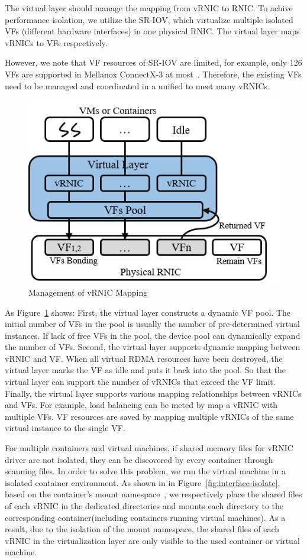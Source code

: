 The virtual layer should manage the mapping from vRNIC to RNIC. To achive performance isolation, we utilize the SR-IOV, which virtualize multiple isolated VFs (different hardware interfaces) in one physical RNIC. The virtual layer maps vRNICs to VFs respectively. 

However, we note that VF resources of SR-IOV are limited, for example, only 126 VFs are supported in Mellanox ConnectX-3 at most~\cite{ofed-manual}. Therefore, the existing VFs need to be managed and coordinated in a unified to meet many vRNICs.

\begin{figure}[!ht]
	\centering
	\includegraphics[width=0.9\linewidth]{images/vf-mapping}
	\caption{Management of vRNIC Mapping}
	\label{fig:vf-mapping}
\end{figure}

As Figure~\ref{fig:vf-mapping} shows: First, the virtual layer constructs a dynamic VF pool. The initial number of VFs in the pool is usually the number of pre-determined virtual instances. If lack of free VFs in the pool, the device pool can dynamically expand the number of VFs. Second, the virtual layer supports dynamic mapping between vRNIC and VF. When all virtual RDMA resources have been destroyed, the virtual layer marks the VF as idle and puts it back into the pool. So that the virtual layer can support the number of vRNICs that exceed the VF limit. Finally, the virtual layer supports various mapping relationships between vRNICs and VFs. For example, load balancing can be meted by map a vRNIC with multiple VFs. VF resources are saved by mapping multiple vRNICs of the same virtual instance to the single VF. 

For multiple containers and virtual machines, if shared memory files for vRNIC driver are not isolated, they can be discovered by every container through scanning files. In order to solve this problem, we run the virtual machine in a isolated container environment. As shown in in Figure~\ref{fig:interface-isolate}, based on the container's mount namespace~\cite{mount-ns}, we respectively place the shared files of each vRNIC in the dedicated directories and mounts each directory to the corresponding container(including containers running virtual machines). As a result, due to the isolation of the mount namespace, the shared files of each vRNIC in the virtualization layer are only visible to the used container or virtual machine.  

